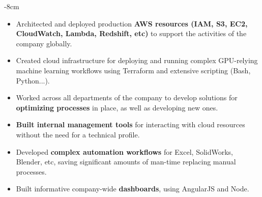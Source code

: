 \documentclass[10pt,a4paper]{altacv}
\begin{document}


\begin{adjustwidth}{}{-8cm}
\makecvheader
\end{adjustwidth}


\begin{itemize}
    \item Architected and deployed production \textbf{AWS resources (IAM, S3, EC2, CloudWatch, Lambda, Redshift, etc)} to support the activities of the company globally.
    \item Created cloud infrastructure for deploying and running complex GPU-relying machine learning workflows using Terraform and extensive scripting (Bash, Python...).
    \item Worked across all departments of the company to develop solutions for \textbf{optimizing processes} in place, as well as developing new ones.
    \item \textbf{Built internal management tools} for interacting with cloud resources without the need for a technical profile.
    \item Developed \textbf{complex automation workflows} for Excel, SolidWorks, Blender, etc, saving significant amounts of man-time replacing manual processes.
    \item Built informative company-wide \textbf{dashboards}, using AngularJS and Node.
\end{itemize}

\divider
\end{document}
